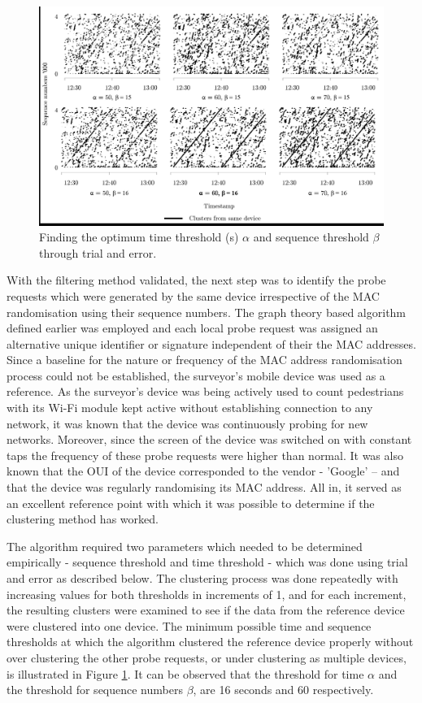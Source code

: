 \begin{figure}
  \includegraphics[trim={1 1 1 1},clip]{images/processing-oxst-clusters.jpg}
  \caption{Finding the optimum time threshold (s) $\alpha$ and sequence threshold $\beta$ through trial and error.}
  \label{figure:processing:oxst:clusters}
\end{figure}

With the filtering method validated, the next step was to identify the probe requests which were generated by the same device irrespective of the MAC randomisation using their sequence numbers.
The graph theory based algorithm defined earlier was employed and each local probe request was assigned an alternative unique identifier or signature independent of their the MAC addresses.
Since a baseline for the nature or frequency of the MAC address randomisation process could not be established, the surveyor’s mobile device was used as a reference.
As the surveyor’s device was being actively used to count pedestrians with its Wi-Fi module kept active without establishing connection to any network, it was known that the device was continuously probing for new networks.
Moreover, since the screen of the device was switched on with constant taps the frequency of these probe requests were higher than normal.
It was also known that the OUI of the device corresponded to the vendor - ’Google’ – and that the device was regularly randomising its MAC address.
All in, it served as an excellent reference point with which it was possible to determine if the clustering method has worked.

The algorithm required two parameters which needed to be determined empirically - sequence threshold and time threshold - which was done using trial and error as described below.
The clustering process was done repeatedly with increasing values for both thresholds in increments of 1, and for each increment, the resulting clusters were  examined to see if the data from the reference device were clustered into one device.
The minimum possible time and sequence thresholds at which the algorithm clustered the reference device properly without over clustering the other probe requests, or under clustering as multiple devices, is illustrated in Figure \ref{figure:processing:oxst:clusters}.
It can be observed that the threshold for time $\alpha$ and the threshold for sequence numbers $\beta$, are 16 seconds and 60 respectively.

